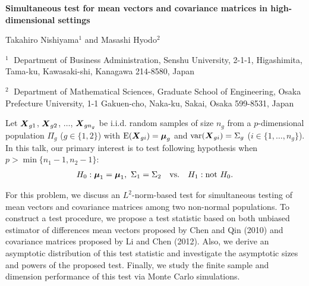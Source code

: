 \documentclass[12pt]{article}
\begin{document}
\begin{flushleft}


{\LARGE\bf Simultaneous test for mean vectors and covariance matrices 
in high-dimensional settings}


\vspace{1.0cm}

Takahiro Nishiyama$^1$ and Masashi Hyodo$^2$

\begin{description}

\item $^1 \;$ Department of Business Administration, Senshu University, 
2-1-1, Higashimita, Tama-ku, Kawasaki-shi, Kanagawa 214-8580, Japan

\item $^2 \;$ Department of Mathematical Sciences, Graduate School of Engineering, 
Osaka Prefecture University, 
1-1 Gakuen-cho, Naka-ku, Sakai, Osaka 599-8531, Japan

\end{description}

\end{flushleft}


\vspace{0.75cm}
\renewcommand{\vec}[1]{\mbox{\boldmath ${#1}$}}

Let $\vec{X}_{g1}$, $\vec{X}_{g2}$, $\ldots$, $\vec{X}_{gn_g}$ be 
i.i.d. random samples of size $n_{g}$ from a $p$-dimensional 
population $\Pi_g$ ($g \in \{1, 2\}$) with ${\rm E}(\vec{X}_{gi})=\vec{\mu}_g$ 
and ${\rm var}(\vec{X}_{gi})=\Sigma_g$ ($i \in \{1, \ldots ,n_g\}$). 
In this talk, our primary interest is to test following hypothesis 
when $p > \min\{n_1-1, n_2-1 \}$: 
\begin{eqnarray*}
H_0 : \vec{\mu}_1 = \vec{\mu}_1,~ \Sigma_1 = \Sigma_2 \quad 
\mbox{vs.} \quad H_1 : \mbox{not}~ H_0.
\end{eqnarray*}

For this problem, we discuss an $L^2$-norm-based test for simultaneous 
testing of mean vectors and covariance matrices among two non-normal populations. 
To construct a test procedure, we propose a test statistic based on both unbiased 
estimator of differences mean vectors proposed by Chen and Qin (2010) 
and covariance matrices proposed by Li and Chen (2012). 
Also, we derive an asymptotic distribution of this test statistic 
and investigate the asymptotic sizes and powers of the proposed test. 
Finally, we study the finite sample and dimension performance 
of this test via Monte Carlo simulations.
\end{document}
